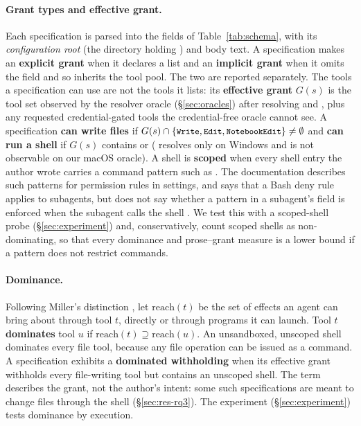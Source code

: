 \paragraph{Grant types and effective grant.} Each specification is parsed into the fields of Table~\ref{tab:schema},
with its \emph{configuration root} (the directory holding ) and body text. A specification makes an \textbf{explicit grant} when it declares a
 list and an \textbf{implicit grant} when it omits the field and so inherits the tool pool. The two are
reported separately. The tools a specification can use are not the tools it
lists: its \textbf{effective grant} $G(s)$ is the tool set observed by the resolver oracle (\S\ref{sec:oracles}) after
resolving  and , plus any requested credential-gated tools the credential-free oracle
cannot see. A specification \textbf{can write files} if $G(s) \cap \{\texttt{\small Write}, \texttt{\small Edit},
\texttt{\small NotebookEdit}\} \neq \emptyset$ and \textbf{can run a shell} if $G(s)$ contains  or 
( resolves only on Windows and is not observable on our macOS oracle). A shell is \textbf{scoped} when
every shell entry the author wrote carries a command pattern such as . The documentation
describes such patterns for permission rules in settings, and says that a Bash deny rule applies to subagents, but
does not say whether a pattern in a subagent's  field is enforced when the subagent calls the shell
\citep{AnthropicSubagentsDoc,AnthropicPermissionsDoc}. We test this with a scoped-shell probe (\S\ref{sec:experiment})
and, conservatively, count scoped shells as non-dominating, so that every dominance and prose--grant measure is a
lower bound if a pattern does not restrict commands.

\paragraph{Dominance.} Following Miller's distinction \citep[\S8.1]{miller2006robust}, let $\mathrm{reach}(t)$ be the
set of effects an agent can bring about through tool $t$, directly or through programs it can launch. Tool $t$
\textbf{dominates} tool $u$ if $\mathrm{reach}(t) \supseteq \mathrm{reach}(u)$. An unsandboxed, unscoped shell
dominates every file tool, because any file operation can be issued as a command. A specification exhibits a
\textbf{dominated withholding} when its effective grant withholds every file-writing tool but contains an unscoped
shell. The term describes the grant, not the author's intent: some such specifications are meant to change files
through the shell (\S\ref{sec:res-rq3}). The experiment (\S\ref{sec:experiment}) tests dominance by execution.

